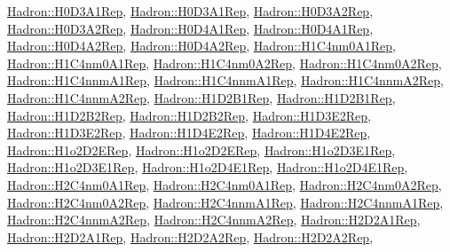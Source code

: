 \mbox{\hyperlink{structHadron_1_1H0D3A1Rep}{Hadron\+::\+H0\+D3\+A1\+Rep}}, \mbox{\hyperlink{structHadron_1_1H0D3A1Rep}{Hadron\+::\+H0\+D3\+A1\+Rep}}, \mbox{\hyperlink{structHadron_1_1H0D3A2Rep}{Hadron\+::\+H0\+D3\+A2\+Rep}}, \mbox{\hyperlink{structHadron_1_1H0D3A2Rep}{Hadron\+::\+H0\+D3\+A2\+Rep}}, \mbox{\hyperlink{structHadron_1_1H0D4A1Rep}{Hadron\+::\+H0\+D4\+A1\+Rep}}, \mbox{\hyperlink{structHadron_1_1H0D4A1Rep}{Hadron\+::\+H0\+D4\+A1\+Rep}}, \mbox{\hyperlink{structHadron_1_1H0D4A2Rep}{Hadron\+::\+H0\+D4\+A2\+Rep}}, \mbox{\hyperlink{structHadron_1_1H0D4A2Rep}{Hadron\+::\+H0\+D4\+A2\+Rep}}, \mbox{\hyperlink{structHadron_1_1H1C4nm0A1Rep}{Hadron\+::\+H1\+C4nm0\+A1\+Rep}}, \mbox{\hyperlink{structHadron_1_1H1C4nm0A1Rep}{Hadron\+::\+H1\+C4nm0\+A1\+Rep}}, \mbox{\hyperlink{structHadron_1_1H1C4nm0A2Rep}{Hadron\+::\+H1\+C4nm0\+A2\+Rep}}, \mbox{\hyperlink{structHadron_1_1H1C4nm0A2Rep}{Hadron\+::\+H1\+C4nm0\+A2\+Rep}}, \mbox{\hyperlink{structHadron_1_1H1C4nnmA1Rep}{Hadron\+::\+H1\+C4nnm\+A1\+Rep}}, \mbox{\hyperlink{structHadron_1_1H1C4nnmA1Rep}{Hadron\+::\+H1\+C4nnm\+A1\+Rep}}, \mbox{\hyperlink{structHadron_1_1H1C4nnmA2Rep}{Hadron\+::\+H1\+C4nnm\+A2\+Rep}}, \mbox{\hyperlink{structHadron_1_1H1C4nnmA2Rep}{Hadron\+::\+H1\+C4nnm\+A2\+Rep}}, \mbox{\hyperlink{structHadron_1_1H1D2B1Rep}{Hadron\+::\+H1\+D2\+B1\+Rep}}, \mbox{\hyperlink{structHadron_1_1H1D2B1Rep}{Hadron\+::\+H1\+D2\+B1\+Rep}}, \mbox{\hyperlink{structHadron_1_1H1D2B2Rep}{Hadron\+::\+H1\+D2\+B2\+Rep}}, \mbox{\hyperlink{structHadron_1_1H1D2B2Rep}{Hadron\+::\+H1\+D2\+B2\+Rep}}, \mbox{\hyperlink{structHadron_1_1H1D3E2Rep}{Hadron\+::\+H1\+D3\+E2\+Rep}}, \mbox{\hyperlink{structHadron_1_1H1D3E2Rep}{Hadron\+::\+H1\+D3\+E2\+Rep}}, \mbox{\hyperlink{structHadron_1_1H1D4E2Rep}{Hadron\+::\+H1\+D4\+E2\+Rep}}, \mbox{\hyperlink{structHadron_1_1H1D4E2Rep}{Hadron\+::\+H1\+D4\+E2\+Rep}}, \mbox{\hyperlink{structHadron_1_1H1o2D2ERep}{Hadron\+::\+H1o2\+D2\+E\+Rep}}, \mbox{\hyperlink{structHadron_1_1H1o2D2ERep}{Hadron\+::\+H1o2\+D2\+E\+Rep}}, \mbox{\hyperlink{structHadron_1_1H1o2D3E1Rep}{Hadron\+::\+H1o2\+D3\+E1\+Rep}}, \mbox{\hyperlink{structHadron_1_1H1o2D3E1Rep}{Hadron\+::\+H1o2\+D3\+E1\+Rep}}, \mbox{\hyperlink{structHadron_1_1H1o2D4E1Rep}{Hadron\+::\+H1o2\+D4\+E1\+Rep}}, \mbox{\hyperlink{structHadron_1_1H1o2D4E1Rep}{Hadron\+::\+H1o2\+D4\+E1\+Rep}}, \mbox{\hyperlink{structHadron_1_1H2C4nm0A1Rep}{Hadron\+::\+H2\+C4nm0\+A1\+Rep}}, \mbox{\hyperlink{structHadron_1_1H2C4nm0A1Rep}{Hadron\+::\+H2\+C4nm0\+A1\+Rep}}, \mbox{\hyperlink{structHadron_1_1H2C4nm0A2Rep}{Hadron\+::\+H2\+C4nm0\+A2\+Rep}}, \mbox{\hyperlink{structHadron_1_1H2C4nm0A2Rep}{Hadron\+::\+H2\+C4nm0\+A2\+Rep}}, \mbox{\hyperlink{structHadron_1_1H2C4nnmA1Rep}{Hadron\+::\+H2\+C4nnm\+A1\+Rep}}, \mbox{\hyperlink{structHadron_1_1H2C4nnmA1Rep}{Hadron\+::\+H2\+C4nnm\+A1\+Rep}}, \mbox{\hyperlink{structHadron_1_1H2C4nnmA2Rep}{Hadron\+::\+H2\+C4nnm\+A2\+Rep}}, \mbox{\hyperlink{structHadron_1_1H2C4nnmA2Rep}{Hadron\+::\+H2\+C4nnm\+A2\+Rep}}, \mbox{\hyperlink{structHadron_1_1H2D2A1Rep}{Hadron\+::\+H2\+D2\+A1\+Rep}}, \mbox{\hyperlink{structHadron_1_1H2D2A1Rep}{Hadron\+::\+H2\+D2\+A1\+Rep}}, \mbox{\hyperlink{structHadron_1_1H2D2A2Rep}{Hadron\+::\+H2\+D2\+A2\+Rep}}, \mbox{\hyperlink{structHadron_1_1H2D2A2Rep}{Hadron\+::\+H2\+D2\+A2\+Rep}}, 